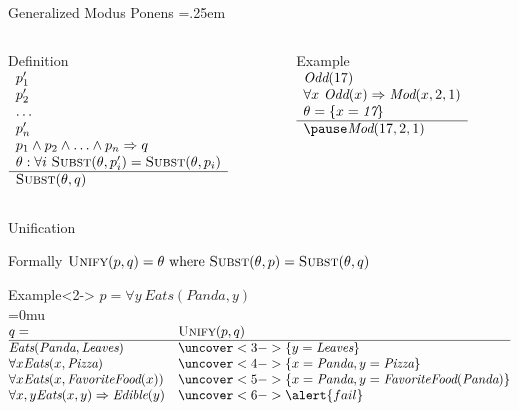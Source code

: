 \documentclass[14pt]{beamer}
\begin{document}
\begin{frame}{Generalized Modus Ponens}
\small
\extrarowheight=.25em
\begin{columns}[T]
\begin{column}{0.5\textwidth}
\begin{block}{Definition}
$
\begin{array}{l}
p_1' \\
p_2' \\
\ldots \\
p_n' \\
p_1 \land p_2 \land \ldots \land p_n \Rightarrow q \\
\theta : \forall i\ \textsc{Subst}(\theta, p_i') = \textsc{Subst}(\theta, p_i)\\
\hline
\textsc{Subst}(\theta, q)
\end{array}
$
\end{block}
\end{column}
\pause
\begin{column}{0.45\textwidth}
\begin{block}{Example}
$
\begin{array}{l}
\textit{Odd}(17) \\
\forall x\ \textit{Odd}(x) \limpl \textit{Mod}(x, 2, 1) \\
\theta = \{x = \textit{17}\} \\
\hline
\pause\textit{Mod}(17, 2, 1)
\end{array}
$
\end{block}
\end{column}
\end{columns}
\end{frame}

\begin{frame}{Unification}
\begin{block}{Formally}
$\textsc{Unify}(p, q) = \theta \mbox{ where } \textsc{Subst}(\theta, p) = \textsc{Subst}(\theta, q)$
\end{block}
\bigskip
\begin{block}{Example}<2->
\small
$p=\forall y\ \textit{Eats}(\textit{Panda}, y)$\\
\thickmuskip=0mu
\medskip
$
\begin{array}{@{} l l @{}}
\thickmuskip=5.0mu q= & \textsc{Unify}(p, q) \\
\hline
\textit{Eats}(\textit{Panda}, \textit{Leaves})
& \uncover<3->{\{y=\textit{Leaves}\}}
\\
\forall x \textit{Eats}(x, \textit{Pizza})
& \uncover<4->{\{x=\textit{Panda}, y=\textit{Pizza}\}}
\\
\forall x \textit{Eats}(x, \textit{FavoriteFood}(x))
& \uncover<5->{\{x=\textit{Panda}, y=\textit{FavoriteFood}(\textit{Panda})\}}
\\
\forall x, y \textit{Eats}(x, y) \limpl \textit{Edible}(y)
& \uncover<6->{\alert{fail}}
\end{array}
$
\end{block}
\end{frame}
\end{document}
